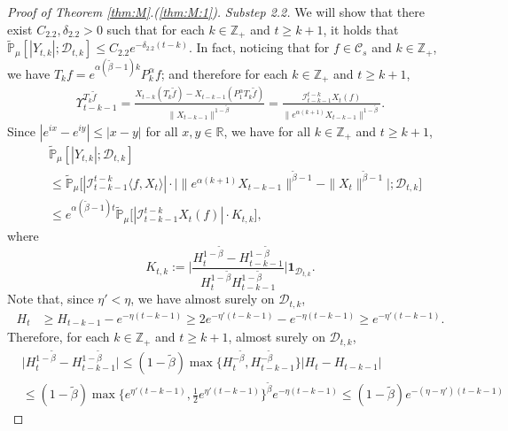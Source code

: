 \documentclass[12pt,a4paper]{amsart}
\theoremstyle{plain}
\theoremstyle{definition}
\numberwithin{equation}{section}
\begin{document}
\begin{proof}[Proof of Theorem \ref{thm:M}.(\ref{thm:M:1})]
  \emph{Substep 2.2.} We will show that there exist $C_{2.2},\delta_{2.2} > 0$ such that for each $k\in \mathbb Z_+$ and $t\geq k+1$, it holds that $ \mathbb{\widetilde{P}}_{\mu} [|Y_{t,k}|;\mathcal{D}_{t,k}] \leq  C_{2.2} e^{-\delta_{2.2} (t-k)}$.
  In fact, noticing that for $f\in \mathcal C_s$ and $k\in \mathbb Z_+$, we have $T_kf = e^{\alpha (\tilde \beta - 1 )k}P_k^\alpha f $; and therefore for each $k\in \mathbb Z_+$ and $t \geq k + 1$,
  \begin{align}
    \label{eq:gammafunction11}
    \Upsilon_{t-k-1}^{T_{k} \tilde f}
    = \frac{X_{t-k}(T_{k} \tilde  f) - X_{t -k-1}(P_1^\alpha T_{k} \tilde f)}{\|X_{t-k-1}\|^{1-\tilde \beta}}
    = \frac{\mathcal I_{t - k - 1}^{t - k} X_t(f)}{\|e^{\alpha (k+1)}X_{t-k-1} \|^{1 -\tilde \beta}}.
  \end{align}
  Since $|e^{ix}-e^{iy}|\leq|x-y|$ for all $x,y\in \mathbb R$, we have for all $k \in \mathbb Z_+$ and $t\geq k+1$,
  \begin{align}
    \label{eq: control of Ykt}
    & \mathbb{\widetilde{P}}_{\mu}[|Y_{t,k}|;\mathcal{D}_{t,k}] \\
    & \leq \mathbb{\widetilde{P}}_{\mu}\Big[|\mathcal I_{t-k-1}^{t-k}\langle f , X_t\rangle | \cdot \Big| \| e^{\alpha(k+1)}X_{t-k-1}\| ^{ \tilde \beta - 1} - \|X_t\|^{ \tilde \beta - 1}\Big|; \mathcal D_{t,k}\Big] \\
    & \leq  e^{\alpha(\tilde \beta - 1)t}\mathbb{\widetilde{P}}_{\mu}\big[|\mathcal I_{t-k-1}^{t-k}X_t(f)|\cdot K_{t,k}\big],
  \end{align}
  where
  \[
    K_{t,k}
    := \Big| \frac {H_t^{1- \tilde \beta} - H_{t-k-1}^{1 - \tilde \beta}} {H_t^{1 - \tilde \beta} H_{t-k-1}^{ 1- \tilde \beta }} \Big| \mathbf{1}_{\mathcal{D}_{t,k}}.
  \]
  Note that, since $\eta' < \eta$, we have almost surely on $\mathcal D_{t,k}$,
  \begin{align}
    H_t
    & \geq H_{t-k-1}- e^{-\eta (t-k-1)}
      \geq 2e^{-\eta'(t-k-1)}-e^{-\eta(t-k-1)}
      \geq e^{-\eta'(t-k-1)}.
  \end{align}
  Therefore, for each $k \in \mathbb Z_+$ and $t\geq k+1$, almost surely  on $\mathcal D_{t,k}$,
  \begin{align}
    & \Big|H_t^{1- \tilde \beta}-H_{t-k-1}^{1- \tilde \beta}\Big|
      \leq (1- \tilde \beta) \max \{ H_t^{-\tilde \beta }, H_{t-k-1}^{ -\tilde \beta} \} | H_t - H_{t-k-1} | \\
    & \leq (1- \tilde \beta ) \max\{e^{\eta' (t-k-1)}, \frac{1}{2}e^{\eta'(t-k-1)}\}^{\tilde \beta} e^{-\eta(t-k-1)}  \leq (1- \tilde \beta) e^{-(\eta - \eta') (t-k-1)}

\end{align}
\end{proof}
\end{document}
